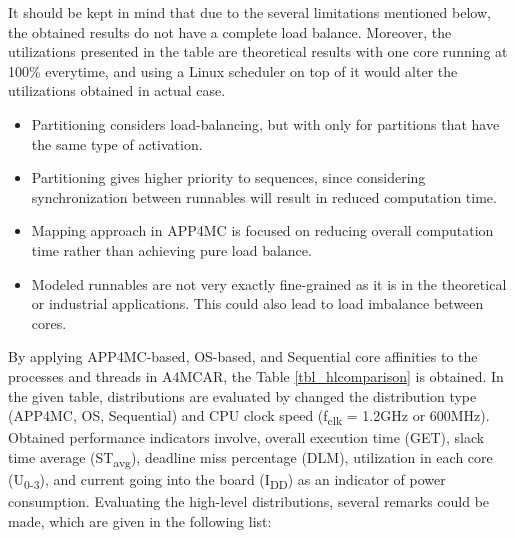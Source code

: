 It should be kept in mind that due to the several limitations mentioned below, the obtained results do not have a complete load balance. Moreover, the utilizations presented in the table are theoretical results with one core running at 100\% everytime, and using a Linux scheduler on top of it would alter the utilizations obtained in actual case.

\begin{itemize}
	\item Partitioning considers load-balancing, but with only for partitions that have the same type of activation.
	\item Partitioning gives higher priority to sequences, since considering synchronization between runnables will result in reduced computation time.
	\item Mapping approach in APP4MC is focused on reducing overall computation time rather than achieving pure load balance.
	\item Modeled runnables are not very exactly fine-grained as it is in the theoretical or industrial applications. This could also lead to load imbalance between cores.
\end{itemize}

By applying APP4MC-based, OS-based, and Sequential core affinities to the processes and threads in A4MCAR, the Table \ref{tbl_hlcomparison} is obtained. In the given table, distributions are evaluated by changed the distribution type (APP4MC, OS, Sequential) and CPU clock speed (f\textsubscript{clk} = 1.2GHz or 600MHz). Obtained performance indicators involve, overall execution time (GET), slack time average (ST\textsubscript{avg}), deadline miss percentage (DLM), utilization in each core (U\textsubscript{0-3}), and current going into the board (I\textsubscript{DD}) as an indicator of power consumption. Evaluating the high-level distributions, several remarks could be made, which are given in the following list:

\hlcomparison

